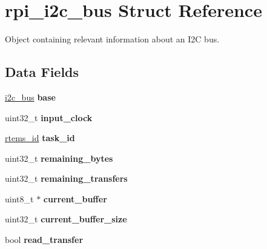 \hypertarget{structrpi__i2c__bus}{}\section{rpi\+\_\+i2c\+\_\+bus Struct Reference}
\label{structrpi__i2c__bus}


Object containing relevant information about an I2C bus.  


\subsection*{Data Fields}
\begin{DoxyCompactItemize}
\item 
\mbox{\label{structrpi__i2c__bus_a3d7873b6e139c91aff7f659e0db38d25}} 
\mbox{\hyperlink{structi2c__bus}{i2c\+\_\+bus}} {\bfseries base}
\item 
\mbox{\label{structrpi__i2c__bus_a0a739b407a469be22fc5695470e7552c}} 
uint32\+\_\+t {\bfseries input\+\_\+clock}
\item 
\mbox{\label{structrpi__i2c__bus_a14eafa8d3bb9c2f7f88aa566a1964e47}} 
\mbox{\hyperlink{group__ClassicTasks_gab20892b814dced7dd4e5b9bf42becd57}{rtems\+\_\+id}} {\bfseries task\+\_\+id}
\item 
\mbox{\label{structrpi__i2c__bus_a233bcba4a5d0ae92bf7b2afca90c4479}} 
uint32\+\_\+t {\bfseries remaining\+\_\+bytes}
\item 
\mbox{\label{structrpi__i2c__bus_a8c71f47b68b6537d158365a68ba1fc00}} 
uint32\+\_\+t {\bfseries remaining\+\_\+transfers}
\item 
\mbox{\label{structrpi__i2c__bus_a88dfd4639269343d7434280cdc49825e}} 
uint8\+\_\+t $\ast$ {\bfseries current\+\_\+buffer}
\item 
\mbox{\label{structrpi__i2c__bus_a39488ce2ff338e535aaad5438d8b3524}} 
uint32\+\_\+t {\bfseries current\+\_\+buffer\+\_\+size}
\item 
\mbox{\label{structrpi__i2c__bus_ac722316e74a4af571f4b71f3d450e16a}} 
bool {\bfseries read\+\_\+transfer}
\end{DoxyCompactItemize}


